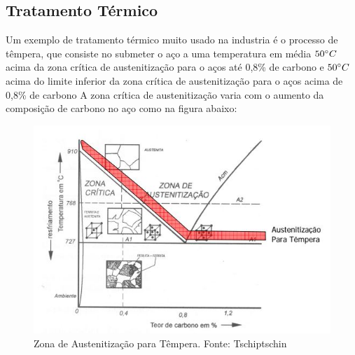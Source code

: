 \subsection{Tratamento Térmico}

Um exemplo de tratamento térmico muito usado na industria é o processo de têmpera, que consiste no submeter o aço a uma temperatura em média $50 \degree C$ acima da zona crítica de austenitização para o aços até 0,8\% de carbono e $50 \degree C$ acima do limite inferior da zona crítica de austenitização para o aços acima de 0,8\% de carbono A zona crítica de austenitização varia com o aumento da composição de carbono no aço como na figura abaixo:
\begin{figure}[!h]
	\centering
	\label{austenitizacao}
	\includegraphics[keepaspectratio=true,scale=0.8]{figuras/austenitizacao.JPG}
	\caption{Zona de Austenitização para Têmpera. Fonte: Tschiptschin}
\end{figure}

